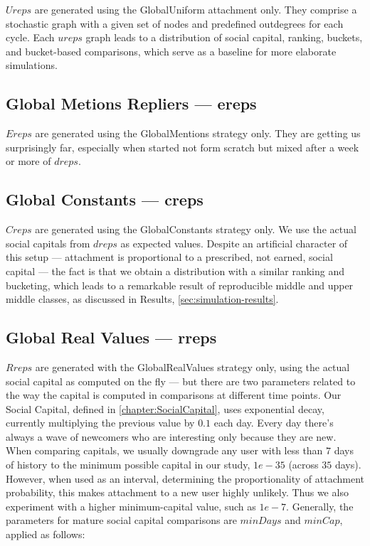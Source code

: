 \documentclass[10pt,oneside]{memoir}
\begin{document}
$Ureps$ are generated using the GlobalUniform attachment only.  They comprise a stochastic graph with a given set of nodes and predefined outdegrees for each cycle.  Each $ureps$ graph leads to a distribution of social capital, ranking, buckets, and bucket-based comparisons, which serve as a baseline for more elaborate simulations.


\subsection{Global Metions Repliers --- ereps}
\label{globalmetionsrepliersereps}

$Ereps$ are generated using the GlobalMentions strategy only.  They are getting us surprisingly far, especially when started not form scratch but mixed after a week or more of $dreps$.


\subsection{Global Constants --- creps}
\label{globalconstantscreps}

$Creps$ are generated using the GlobalConstants strategy only.  We use the actual social capitals from $dreps$ as expected values.  Despite an artificial character of this setup --- attachment is proportional to a prescribed, not earned, social capital --- the fact is that we obtain a distribution with a similar ranking and bucketing, which leads to a remarkable result of reproducible middle and upper middle classes, as discussed in Results, \ref{sec:simulation-results}.


\subsection{Global Real Values --- rreps}
\label{globalrealvaluesrreps}

$Rreps$ are generated with the GlobalRealValues strategy only, using the actual social capital as computed on the fly --- but there are two parameters related to the way the capital is computed in comparisons at different time points.  Our Social Capital, defined in \ref{chapter:SocialCapital}, uses exponential decay, currently multiplying the previous value by $0.1$ each day.  Every day there's always a wave of newcomers who are interesting only because they are new.  When comparing capitals, we usually downgrade any user with less than $7$ days of history to the minimum possible capital in our study, $1e-35$ (across $35$ days).  However, when used as an interval, determining the proportionality of attachment probability, this makes attachment to a new user highly unlikely.  Thus we also experiment with a higher minimum-capital value, such as $1e-7$.  Generally, the parameters for mature social capital comparisons are $minDays$ and $minCap$, applied as follows:
\end{document}
